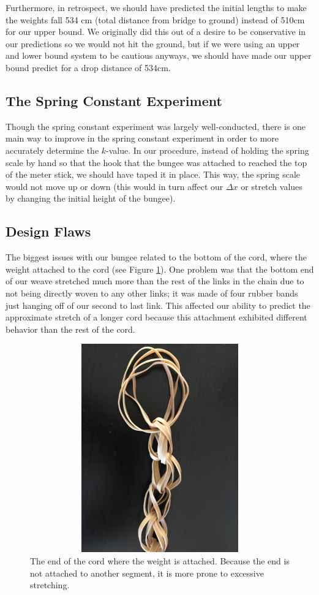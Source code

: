 \documentclass[12pt]{article}
\begin{document}
Furthermore, in retrospect, we should have predicted the initial lengths to make the weights fall 534 cm (total distance from bridge to ground) instead of 510cm for our upper bound. We originally did this out of a desire to be conservative in our predictions so we would not hit the ground, but if we were using an upper and lower bound system to be cautious anyways, we should have made our upper bound predict for a drop distance of 534cm.

\subsection{The Spring Constant Experiment}
Though the spring constant experiment was largely well-conducted, there is one main way to improve in the spring constant experiment in order to more accurately determine the $k$-value. In our procedure, instead of holding the spring scale by hand so that the hook that the bungee was attached to reached the top of the meter stick, we should have taped it in place. This way, the spring scale would not move up or down (this would in turn affect our $\Delta x$ or stretch values by changing the initial height of the bungee). 

\subsection{Design Flaws}
The biggest issues with our bungee related to the bottom of the cord, where the weight attached to the cord (see Figure \ref{fig:endOfCord}). One problem was that the bottom end of our weave stretched much more than the rest of the links in the chain due to not being directly woven to any other links; it was made of four rubber bands just hanging off of our second to last link. This affected our ability to predict the approximate stretch of a longer cord because this attachment exhibited different behavior than the rest of the cord.
\newline

\begin{figure}
    \centering
    \includegraphics[width=15cm,height=9cm]{endOfCord}
    \caption{The end of the cord where the weight is attached. Because the end is not attached to another segment, it is more prone to excessive stretching.}
    \label{fig:endOfCord}
\end{figure}
\end{document}
